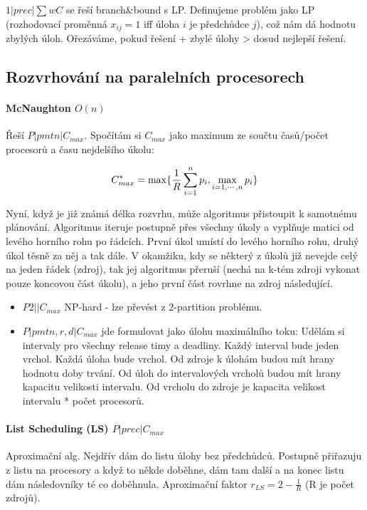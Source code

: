 $1|prec|\sum wC$ se řeší branch\&bound s LP. Definujeme problém jako LP (rozhodovací proměnná $x_{ij} = 1 $ iff úloha $i$ je předchůdce $j$), což nám dá hodnotu zbylých úloh. Ořezáváme, pokud řešení + zbylé úlohy > dosud nejlepší řešení.

\subsection{Rozvrhování na paralelních procesorech}
\paragraph{McNaughton $O(n)$} Řeší $P|pmtn|C_{max}$. Spočítám si $C_{max}$ jako maximum ze součtu časů/počet procesorů a času nejdelšího úkolu:

$$C^{*}_{max} = \max \{{{1} \over {R}} \sum^{n}_{i = 1} p_{i}, \max_{i = 1, \cdots, n} p_{i} \}$$

Nyní, když je již známá délka rozvrhu, může algoritmus přistoupit k samotnému plánování. Algoritmus iteruje postupně přes všechny úkoly a vyplňuje matici od levého horního rohu po řádcích. První úkol umístí do levého horního rohu, druhý úkol těsně za něj a tak dále. V okamžiku, kdy se některý z úkolů již nevejde celý na jeden řádek (zdroj), tak jej algoritmus přeruší (nechá na k-tém zdroji vykonat pouze koncovou část úkolu), a jeho první část rovrhne na zdroj následující.

\begin{itemize}
\item $P2||C_{max}$ NP-hard - lze převést z 2-partition problému.
\item $P|pmtn,r,d|C_{max}$ jde formulovat jako úlohu maximálního toku: Udělám si intervaly pro všechny release timy a deadliny. Každý interval bude jeden vrchol. Každá úloha bude vrchol. Od zdroje k úlohám budou mít hrany hodnotu doby trvání. Od úloh do intervalových vrcholů budou mít hrany kapacitu velikosti intervalu. Od vrcholu do zdroje je kapacita velikost intervalu * počet procesorů.
\end{itemize}

\paragraph{List Scheduling (LS) $P|prec|C_{max}$} Aproximační alg. Nejdřív dám do listu úlohy bez předchůdců. Postupně přiřazuju z listu na procesory a když to někde doběhne, dám tam další a na konec listu dám následovníky té co doběhnula. Aproximační faktor $r_{LS} = 2 - \frac{1}{R}$ (R je počet zdrojů).

